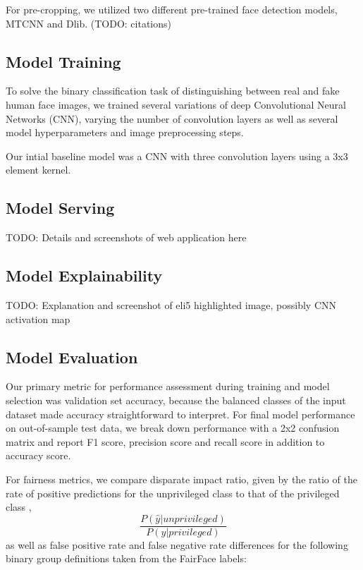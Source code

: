 \documentclass[11pt, letterpaper]{article}
\begin{document}
\begin{multicols}{2}
  For pre-cropping, we utilized two different pre-trained face detection models,
  MTCNN and Dlib. (TODO: citations)

  \subsection{Model Training}

  To solve the binary classification task of distinguishing between real and
  fake human face images, we trained several variations of deep Convolutional
  Neural Networks (CNN), varying the number of convolution layers as well as
  several model hyperparameters and image preprocessing steps.

  Our intial baseline model was a CNN with three convolution layers using a 3x3
  element kernel.

  \subsection{Model Serving}

  TODO: Details and screenshots of web application here

  \subsection{Model Explainability}

  TODO: Explanation and screenshot of eli5 highlighted image, possibly CNN
  activation map

  \subsection{Model Evaluation}

  Our primary metric for performance assessment during training and model
  selection was validation set accuracy, because the balanced classes of the
  input dataset made accuracy straightforward to interpret. For final model
  performance on out-of-sample test data, we break down performance with a 2x2
  confusion matrix and report F1 score, precision score and recall score in
  addition to accuracy score.

  For fairness metrics, we compare disparate impact ratio, given by the ratio
  of the rate of positive predictions for the unprivileged class to that of the
  privileged class \cite{fairMLHealth},
  $$\frac{P(\hat{y}|unprivileged)}{P(\hat{y}|privileged)}$$
  as well as false positive rate and false negative rate differences
  for the following binary group definitions taken from the FairFace
  labels:


\end{multicols}
\end{document}
